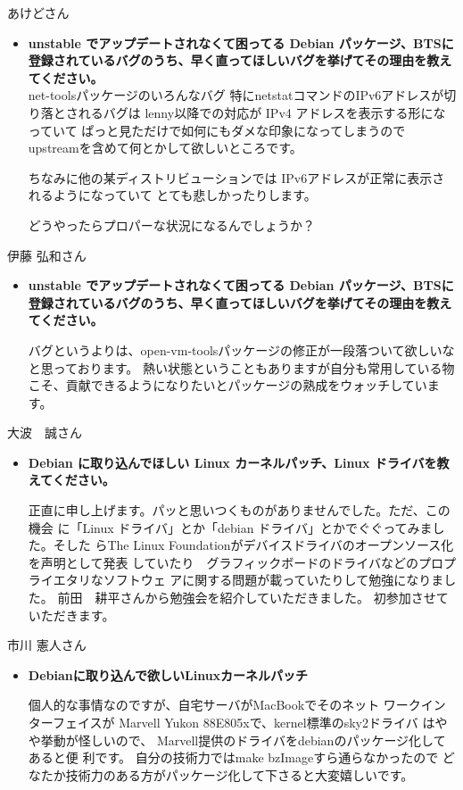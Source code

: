 \documentclass[cjk,dvipdfmx,12pt]{beamer}
\begin{document}
\begin{frame}{あけどさん}
\begin{itemize}
\item {\bf  unstable でアップデートされなくて困ってる Debian パッケージ、BTSに登録されているバグのうち、早く直ってほしいバグを挙げてその理由を教えてください。}
\\
net-toolsパッケージのいろんなバグ
特にnetstatコマンドのIPv6アドレスが切り落とされるバグは
lenny以降での対応が IPv4 アドレスを表示する形になっていて
ぱっと見ただけで如何にもダメな印象になってしまうので
upstreamを含めて何とかして欲しいところです。

ちなみに他の某ディストリビューションでは
IPv6アドレスが正常に表示されるようになっていて
とても悲しかったりします。

どうやったらプロパーな状況になるんでしょうか？
\end{itemize}
\end{frame}

\begin{frame}{伊藤 弘和さん}
\begin{itemize}
\item {\bf  unstable でアップデートされなくて困ってる Debian パッケージ、BTSに登録されているバグのうち、早く直ってほしいバグを挙げてその理由を教えてください。}

バグというよりは、open-vm-toolsパッケージの修正が一段落ついて欲しいなと思っております。
熱い状態ということもありますが自分も常用している物こそ、貢献できるようになりたいとパッケージの熟成をウォッチしています。
\end{itemize}
\end{frame}

\begin{frame}{大波　誠さん}
\begin{itemize}
\item {\bf Debian に取り込んでほしい Linux カーネルパッチ、Linux ドライバを教えてください。}

正直に申し上げます。パッと思いつくものがありませんでした。ただ、この機会
に「Linux ドライバ」とか「debian ドライバ」とかでぐぐってみました。そした
らThe Linux Foundationがデバイスドライバのオープンソース化を声明として発表
していたり　グラフィックボードのドライバなどのプロプライエタリなソフトウェ
アに関する問題が載っていたりして勉強になりました。
前田　耕平さんから勉強会を紹介していただきました。
初参加させていただきます。
\end{itemize}
\end{frame}

\begin{frame}{市川 憲人さん}
\begin{itemize}
\item {\bf  Debianに取り込んで欲しいLinuxカーネルパッチ }

個人的な事情なのですが、自宅サーバがMacBookでそのネット 
ワークインターフェイスが
Marvell Yukon 88E805xで、kernel標準のsky2ドライバ 
はやや挙動が怪しいので、
Marvell提供のドライバをdebianのパッケージ化してあると便 
利です。
自分の技術力ではmake bzImageすら通らなかったので
どなたか技術力のある方がパッケージ化して下さると大変嬉しいです。
\end{itemize}
\end{frame}
\end{document}
